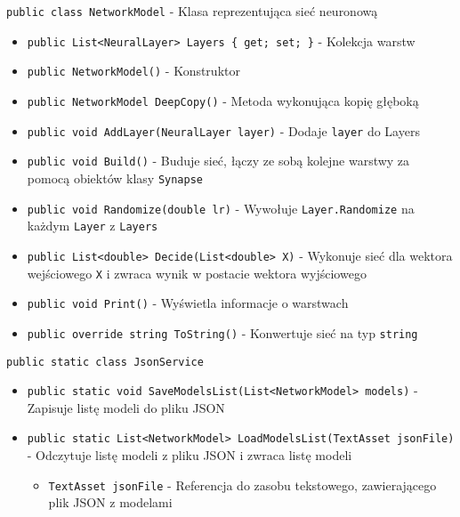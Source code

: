 \documentclass[12pt,a4paper]{article}
\begin{document}
\lstinline{public class NetworkModel} - Klasa reprezentująca sieć neuronową
\begin{itemize}
    \item \lstinline|public List<NeuralLayer> Layers { get; set; }| - Kolekcja warstw
    \item \lstinline|public NetworkModel()| - Konstruktor
    \item \lstinline|public NetworkModel DeepCopy()| - Metoda wykonująca kopię głęboką
    \item \lstinline|public void AddLayer(NeuralLayer layer)| - Dodaje \lstinline{layer} do Layers
    \item \lstinline|public void Build()| - Buduje sieć, łączy ze sobą kolejne warstwy za pomocą obiektów klasy \lstinline{Synapse}
    \item \lstinline|public void Randomize(double lr)| - Wywołuje \lstinline{Layer.Randomize} na każdym \lstinline{Layer} z \lstinline{Layers}
    \item \lstinline|public List<double> Decide(List<double> X)| - Wykonuje sieć dla wektora wejściowego \lstinline{X} i zwraca wynik w postacie wektora wyjściowego
    \item \lstinline|public void Print()| - Wyświetla informacje o warstwach
    \item \lstinline|public override string ToString()| - Konwertuje sieć na typ \lstinline{string}
\end{itemize}


\lstinline{public static class JsonService}
\begin{itemize}
    \item \lstinline|public static void SaveModelsList(List<NetworkModel> models)| - Zapisuje listę modeli do pliku JSON
    \item \lstinline|public static List<NetworkModel> LoadModelsList(TextAsset jsonFile)| - Odczytuje listę modeli z pliku JSON i zwraca listę modeli
    \begin{itemize}
        \item \lstinline{TextAsset jsonFile} - Referencja do zasobu tekstowego, zawierającego plik JSON z modelami
    \end{itemize}
\end{itemize}
\end{document}

